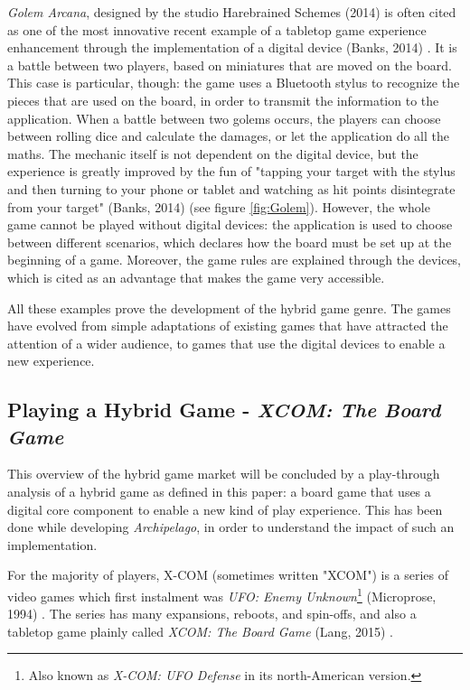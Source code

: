 \textit{Golem Arcana}, designed by the studio Harebrained Schemes (2014) \cite{game:golem} is often cited as one of the most innovative recent example of a tabletop game experience enhancement through the implementation of a digital device (Banks, 2014) \cite{web:golem}. It is a battle between two players, based on miniatures that are moved on the board. This case is particular, though: the game uses a Bluetooth stylus to recognize the pieces that are used on the board, in order to transmit the information to the application. When a battle between two golems occurs, the players can choose between rolling dice and calculate the damages, or let the application do all the maths. The mechanic itself is not dependent on the digital device, but the experience is greatly improved by the fun of "tapping your target with the stylus and then turning to your phone or tablet and watching as hit points disintegrate from your target" (Banks, 2014) \cite{web:golem} (see figure \ref{fig:Golem}). However, the whole game cannot be played without digital devices: the application is used to choose between different scenarios, which declares how the board must be set up at the beginning of a game. Moreover, the game rules are explained through the devices, which is cited as an advantage that makes the game very accessible.

All these examples prove the development of the hybrid game genre. The games have evolved from simple adaptations of existing games that have attracted the attention of a wider audience, to games that use the digital devices to enable a new experience. 

\subsection{Playing a Hybrid Game - \textit{XCOM: The Board Game}}
\label{sec:xcom}
This overview of the hybrid game market will be concluded by a play-through analysis of a hybrid game as defined in this paper: a board game that uses a digital core component to enable a new kind of play experience. This has been done while developing \textit{Archipelago}, in order to understand the impact of such an implementation.

For the majority of players, X-COM (sometimes written "XCOM") is a series of video games which first instalment was \textit{UFO: Enemy Unknown}\footnote{Also known as \textit{X-COM: UFO Defense} in its north-American version.} (Microprose, 1994) \cite{game:xcom}. The series has many expansions, reboots, and spin-offs, and also a tabletop game plainly called \textit{XCOM: The Board Game} (Lang, 2015) \cite{game:xcomtbg}.


